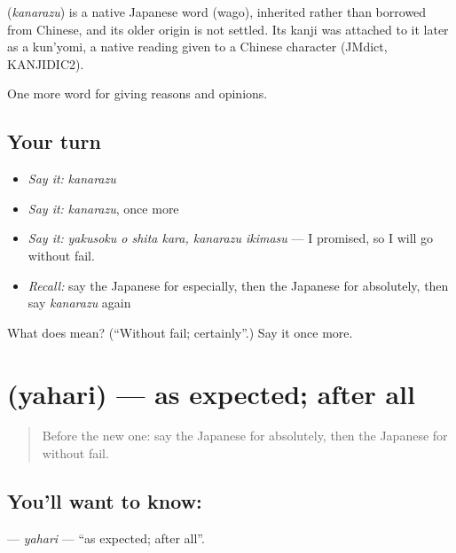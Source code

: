 \begin{cousinweb}
\textbf{} (\emph{kanarazu}) is a native Japanese word (wago), inherited rather than borrowed from Chinese, and its older origin is not settled. Its kanji was attached to it later as a kun'yomi, a native reading given to a Chinese character (JMdict, KANJIDIC2).
\end{cousinweb}

\begin{grammarlens}[title={What you've built}]
One more word for giving reasons and opinions.
\end{grammarlens}

\subsection*{Your turn}
\begin{itemize}
\raggedright
  \item \emph{Say it:} \emph{kanarazu}
  \item \emph{Say it:} \emph{kanarazu}, once more
  \item \emph{Say it:} \emph{yakusoku o shita kara, kanarazu ikimasu} — I promised, so I will go without fail.
  \item \emph{Recall:} say the Japanese for especially, then the Japanese for absolutely, then say \emph{kanarazu} again
\end{itemize}

\begin{tcolorbox}[breakable,colback=teal!4,colframe=teal!35!black,title={Before you move on}]
What does  mean? (\textquotedblleft{}Without fail; certainly\textquotedblright{}.) Say it once more.
\end{tcolorbox}
\section[\texorpdfstring{\ja{やはり} (yahari)}{やはり (yahari)}]{ (yahari) — as expected; after all}

\label{lesson:JA-C321-yahari}



\begin{quote}
Before the new one: say the Japanese for absolutely, then the Japanese for without fail.
\end{quote}

\subsection*{You'll want to know: }
\textbf{} — \emph{yahari} — \textquotedblleft{}as expected; after all\textquotedblright{}.

